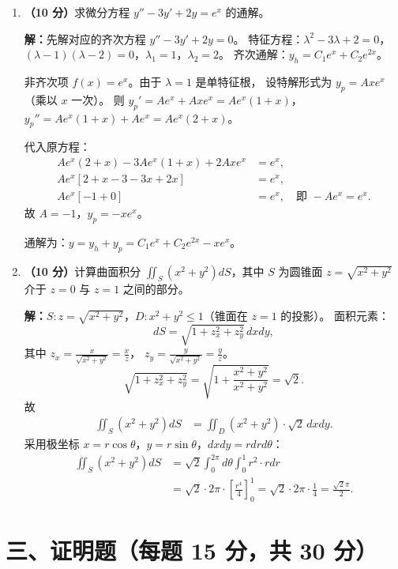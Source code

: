 \documentclass[12pt,a4paper]{ctexart}
\begin{document}
\begin{enumerate}[leftmargin=*,label=\arabic*.,start=5]
  \item \textbf{（10 分）}求微分方程 $y'' - 3y' + 2y = e^x$ 的通解。

    \textbf{解：}先解对应的齐次方程 $y'' - 3y' + 2y = 0$。
    特征方程：$\lambda^2 - 3\lambda + 2 = 0$，
    $(\lambda-1)(\lambda-2) = 0$，$\lambda_1=1$，$\lambda_2=2$。
    齐次通解：$y_h = C_1 e^x + C_2 e^{2x}$。

    非齐次项 $f(x) = e^x$。由于 $\lambda=1$ 是单特征根，
    设特解形式为 $y_p = A x e^x$（乘以 $x$ 一次）。
    则 $y_p' = A e^x + A x e^x = A e^x(1+x)$，
    $y_p'' = A e^x(1+x) + A e^x = A e^x(2+x)$。

    代入原方程：
    \begin{align*}
      A e^x(2+x) - 3A e^x(1+x) + 2A x e^x &= e^x, \\
      A e^x[2+x - 3 - 3x + 2x] &= e^x, \\
      A e^x[-1 + 0] &= e^x, \quad \text{即 } -A e^x = e^x.
    \end{align*}
    故 $A = -1$，$y_p = -x e^x$。

    通解为：$y = y_h + y_p = C_1 e^x + C_2 e^{2x} - x e^x$。

  \item \textbf{（10 分）}计算曲面积分 $\displaystyle\iint_S (x^2+y^2) dS$，其中 $S$ 为圆锥面
    $z = \sqrt{x^2+y^2}$ 介于 $z=0$ 与 $z=1$ 之间的部分。

    \textbf{解：}$S: z = \sqrt{x^2+y^2}$，$D: x^2+y^2 \le 1$（锥面在 $z=1$ 的投影）。
    面积元素：
    \[
    dS = \sqrt{1+z_x^2+z_y^2}\,dxdy,
    \]
    其中 $z_x = \frac{x}{\sqrt{x^2+y^2}} = \frac{x}{z}$，
    $z_y = \frac{y}{\sqrt{x^2+y^2}} = \frac{y}{z}$。
    \[
    \sqrt{1+z_x^2+z_y^2} = \sqrt{1+\frac{x^2+y^2}{x^2+y^2}} = \sqrt{2}.
    \]
    故
    \begin{align*}
      \iint_S (x^2+y^2) dS
      &= \iint_D (x^2+y^2) \cdot \sqrt{2} \,dxdy.
    \end{align*}
    采用极坐标 $x=r\cos\theta$，$y=r\sin\theta$，$dxdy = r dr d\theta$：
    \begin{align*}
      \iint_S (x^2+y^2) dS
      &= \sqrt{2}\int_0^{2\pi} d\theta \int_0^1 r^2 \cdot r dr \\
      &= \sqrt{2}\cdot 2\pi \cdot \left[\frac{r^4}{4}\right]_0^1
       = \sqrt{2}\cdot 2\pi \cdot \frac{1}{4}
       = \frac{\sqrt{2}\pi}{2}.
    \end{align*}
\end{enumerate}

\section*{三、证明题（每题 15 分，共 30 分）}
\end{document}
